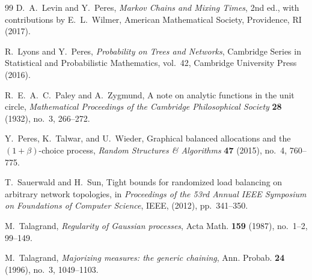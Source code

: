 \documentclass[11pt]{article}
\numberwithin{equation}{section}
\newcommand{\1}{\mathbf{1}}
\begin{document}
\begin{thebibliography}{99}
D.~A.~Levin and Y.~Peres,
\emph{Markov Chains and Mixing Times},
2nd ed., with contributions by E.~L.~Wilmer,
American Mathematical Society, Providence, RI (2017).

R.~Lyons and Y.~Peres,
\emph{Probability on Trees and Networks},
Cambridge Series in Statistical and Probabilistic Mathematics, vol.~42,
Cambridge University Press (2016).

R.~E.~A.~C.~Paley and A.~Zygmund,
A note on analytic functions in the unit circle,
\emph{Mathematical Proceedings of the Cambridge Philosophical Society}
\textbf{28} (1932), no.~3, 266--272.

Y.~Peres, K.~Talwar, and U.~Wieder,
Graphical balanced allocations and the \((1+\beta)\)-choice process,
\emph{Random Structures \& Algorithms}
\textbf{47} (2015), no.~4, 760--775.

T.~Sauerwald and H.~Sun,
Tight bounds for randomized load balancing on arbitrary network topologies,
in \emph{Proceedings of the 53rd Annual IEEE Symposium on Foundations of Computer Science},
IEEE, (2012), pp.~341--350.

M.~Talagrand,
\emph{Regularity of Gaussian processes},
Acta Math. \textbf{159} (1987), no.~1--2, 99--149.

M.~Talagrand,
\emph{Majorizing measures: the generic chaining},
Ann. Probab. \textbf{24} (1996), no.~3, 1049--1103.

\end{thebibliography}
\end{document}
